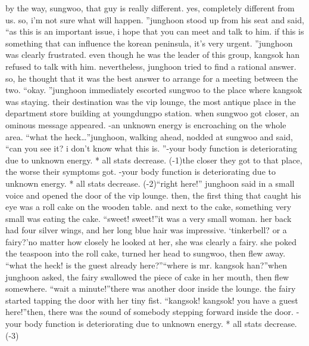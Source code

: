  by the way, sungwoo, that guy is really different.
 yes, completely different from us.
 so, i’m not sure what will happen.
”junghoon stood up from his seat and said, “as this is an important issue, i hope that you can meet and talk to him.
 if this is something that can influence the korean peninsula, it’s very urgent.
”junghoon was clearly frustrated.
 even though he was the leader of this group, kangsok han refused to talk with him.
nevertheless, junghoon tried to find a rational answer.
 so, he thought that it was the best answer to arrange for a meeting between the two.
“okay.
”junghoon immediately escorted sungwoo to the place where kangsok was staying.
their destination was the vip lounge, the most antique place in the department store building at youngdungpo station.
 when sungwoo got closer, an ominous message appeared.
-an unknown energy is encroaching on the whole area.
“what the heck…”junghoon, walking ahead, nodded at sungwoo and said, “can you see it? i don’t know what this is.
”-your body function is deteriorating due to unknown energy.
* all stats decrease.
 (-1)the closer they got to that place, the worse their symptoms got.
-your body function is deteriorating due to unknown energy.
* all stats decrease.
 (-2)“right here!” junghoon said in a small voice and opened the door of the vip lounge.
then, the first thing that caught his eye was a roll cake on the wooden table.
 and next to the cake, something very small was eating the cake.
“sweet! sweet!”it was a very small woman.
 her back had four silver wings, and her long blue hair was impressive.
‘tinkerbell? or a fairy?’no matter how closely he looked at her, she was clearly a fairy.
 she poked the teaspoon into the roll cake, turned her head to sungwoo, then flew away.
“what the heck! is the guest already here?”“where is mr.
 kangsok han?”when junghoon asked, the fairy swallowed the piece of cake in her mouth, then flew somewhere.
“wait a minute!”there was another door inside the lounge.
 the fairy started tapping the door with her tiny fist.
“kangsok! kangsok! you have a guest here!”then, there was the sound of somebody stepping forward inside the door.
-your body function is deteriorating due to unknown energy.
* all stats decrease.
 (-3)

